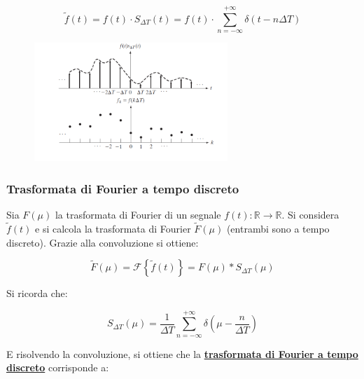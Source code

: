 \documentclass[a4paper]{article}
\begin{document}
	\begin{equation*}
		\tilde{f}\left(t\right) = f\left(t\right) \cdot S_{\Delta T}\left(t\right) = f\left(t\right) \cdot \sum_{n = -\infty}^{+\infty} \delta\left(t - n \Delta T\right)
	\end{equation*}

	\begin{figure}[!htp]
		\centering
		\includegraphics[width=0.65\textwidth]{img/campionamento_3.png}
	\end{figure}
	
	\newpage
	
	\subsubsection{Trasformata di Fourier a tempo discreto}
	
	Sia $F\left(\mu\right)$ la trasformata di Fourier di un segnale $f\left(t\right): \mathbb{R} \rightarrow \mathbb{R}$. Si considera $\tilde{f}\left(t\right)$ e si calcola la trasformata di Fourier $\tilde{F}\left(\mu\right)$ (entrambi sono a tempo discreto). Grazie alla convoluzione si ottiene:
	
	\begin{equation*}
		\tilde{F}\left(\mu\right) = \mathcal{F}\left\{\tilde{f}\left(t\right)\right\} = F\left(\mu\right) * S_{\Delta T}\left(\mu\right)
	\end{equation*}

	\noindent
	Si ricorda che:
	
	\begin{equation*}
		S_{\Delta T} \left(\mu\right) = \dfrac{1}{\Delta T} \sum_{n = -\infty}^{+\infty}\delta\left(\mu - \dfrac{n}{\Delta T}\right)
	\end{equation*}	

	\noindent
	E risolvendo la convoluzione, si ottiene che la \textcolor{Red3}{\textbf{\underline{trasformata di Fourier a tempo}}} \textcolor{Red3}{\textbf{\underline{discreto}}} corrisponde a:
	
\end{document}

